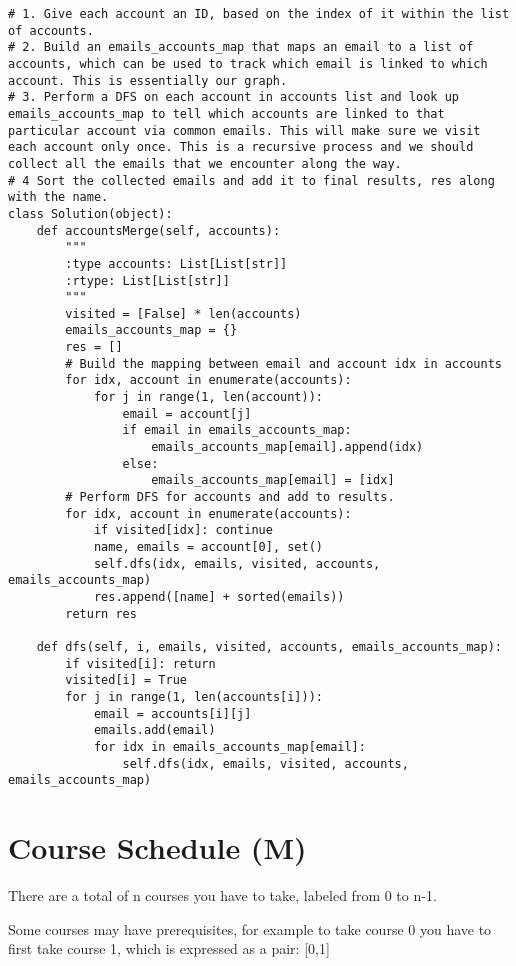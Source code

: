 \begin{lstlisting}
# 1. Give each account an ID, based on the index of it within the list of accounts.
# 2. Build an emails_accounts_map that maps an email to a list of accounts, which can be used to track which email is linked to which account. This is essentially our graph.
# 3. Perform a DFS on each account in accounts list and look up emails_accounts_map to tell which accounts are linked to that particular account via common emails. This will make sure we visit each account only once. This is a recursive process and we should collect all the emails that we encounter along the way.
# 4 Sort the collected emails and add it to final results, res along with the name.
class Solution(object):
    def accountsMerge(self, accounts):
        """
        :type accounts: List[List[str]]
        :rtype: List[List[str]]
        """
        visited = [False] * len(accounts)
        emails_accounts_map = {}
        res = []
        # Build the mapping between email and account idx in accounts
        for idx, account in enumerate(accounts):
            for j in range(1, len(account)):
                email = account[j]
                if email in emails_accounts_map:
                    emails_accounts_map[email].append(idx)
                else:
                    emails_accounts_map[email] = [idx]
        # Perform DFS for accounts and add to results.
        for idx, account in enumerate(accounts):
            if visited[idx]: continue
            name, emails = account[0], set()
            self.dfs(idx, emails, visited, accounts, emails_accounts_map)
            res.append([name] + sorted(emails))
        return res
    
    def dfs(self, i, emails, visited, accounts, emails_accounts_map):
        if visited[i]: return
        visited[i] = True
        for j in range(1, len(accounts[i])):
            email = accounts[i][j]
            emails.add(email)
            for idx in emails_accounts_map[email]:
                self.dfs(idx, emails, visited, accounts, emails_accounts_map)
\end{lstlisting}

\section{Course Schedule (M)}
There are a total of n courses you have to take, labeled from 0 to n-1.

Some courses may have prerequisites, for example to take course 0 you have to first take course 1, which is expressed as a pair: [0,1]

